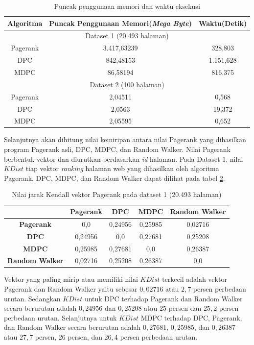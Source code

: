\begin{longtable}{|c|c|c|}
	\caption{Puncak penggunaan memori dan waktu eksekusi}
	\label{table:algorithm_performance} \\
	\hline
	\textbf{Algoritma} & \textbf{Puncak Penggunaan Memori(\textit{Mega Byte})} & \textbf{Waktu(Detik)} \\
	\hline
	\multicolumn{3}{|c|}{Dataset 1 (20.493 halaman)} \\
	\hline
	Pagerank & 3.417,63239 & 328,803 \\
	DPC & 842,48153 & 1.151,628 \\
	MDPC & 86,58194 & 816,375 \\
	\hline
	\multicolumn{3}{|c|}{Dataset 2 (100 halaman)} \\
	\hline
	Pagerank & 2,04511 & 0,568 \\
	DPC & 2,0563 & 19,372 \\
	MDPC & 2,05595 & 0,652 \\
	\hline
\end{longtable}

Selanjutnya akan dihitung nilai kemiripan antara nilai Pagerank yang dihasilkan program Pagerank asli, DPC, MDPC, dan Random Walker. Nilai Pagerank berbentuk vektor dan diurutkan berdasarkan \textit{id} halaman. Pada Dataset 1, nilai $KDist$ tiap vektor \textit{ranking} halaman web yang dihasilkan oleh algoritma Pagerank, DPC, MDPC, dan Random Walker dapat dilihat pada tabel \ref{table:kendall_distance_score_dataset_1}. 

\begin{longtable}{|c|c|c|c|c|}
	\caption{Nilai jarak Kendall vektor Pagerank pada dataset 1 (20.493 halaman)}
	\label{table:kendall_distance_score_dataset_1} \\
	\hline
	& \textbf{Pagerank} & \textbf{DPC} & \textbf{MDPC} & \textbf{Random Walker} \\
	\hline
	\textbf{Pagerank} & 0,0 & 0,24956 & 0,25985 & 0,02716 \\
	\hline
	\textbf{DPC} & 0,24956 & 0,0 & 0,27681 & 0,25208 \\
	\hline
	\textbf{MDPC} & 0,25985 & 0,27681 & 0,0 & 0,26387 \\
	\hline
	\textbf{Random Walker} & 0,02716 & 0,25208 & 0,26387 & 0,0 \\
	\hline
\end{longtable}

Vektor yang paling mirip atau memiliki nilai $KDist$ terkecil adalah vektor Pagerank dan Random Walker yaitu sebesar $0,02716$ atau $2,7$ persen perbedaan urutan. Sedangkan $KDist$ untuk DPC terhadap Pagerank dan Random Walker secara berurutan adalah $0,24956$ dan $0,25208$ atau $25$ persen dan $25,2$ persen perbedaan urutan. Selanjutnya untuk $KDist$ MDPC terhadap DPC, Pagerank, dan Random Walker secara berurutan adalah $0,27681$, $0,25985$, dan $0,26387$ atau $27,7$ persen, $26$ persen, dan $26,4$ persen perbedaan urutan.

